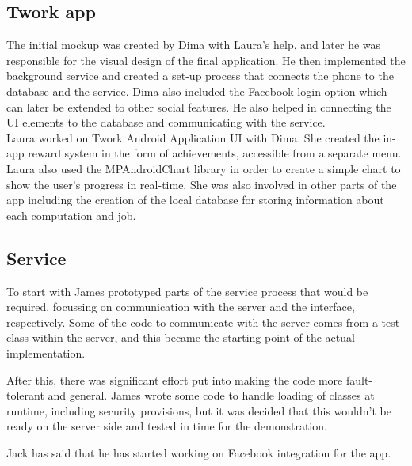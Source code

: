 \documentclass[a4paper,10pt]{article}
\begin{document}
\subsection{Twork app}
The initial mockup was created by Dima with Laura's help, and later he was responsible for the visual design of the final application. He then implemented the background service and created a set-up process that connects the phone to the database and the service. Dima also included the Facebook login option which can later be extended to other social features. He also helped in connecting the UI elements to the database and communicating with the service.\\

Laura worked on Twork Android Application UI with Dima. She created the in-app reward system in the form of achievements, accessible from a separate menu.
Laura also used the MPAndroidChart library in order to create a simple chart to show the user's progress in real-time.
She was also involved in other parts of the app including the creation of the local database for storing information about each computation and job.

\subsection{Service}
To start with James prototyped parts of the service process that would be required, focussing on communication with the server and the interface, respectively.
Some of the code to communicate with the server comes from a test class within the server, and this became the starting point of the actual implementation.

After this, there was significant effort put into making the code more fault-tolerant and general. James wrote some code to handle loading of classes at runtime, including security provisions, but it was decided that this wouldn't be ready on the server side and tested in time for the demonstration.

Jack has said that he has started working on Facebook integration for the app.
\end{document}
